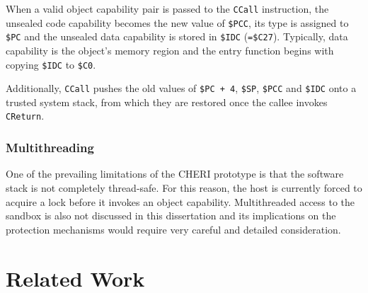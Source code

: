\documentclass[a4paper,12pt,twoside,openright]{report}
\newcommand{\reg}[1]{\texttt{\$#1}}
\newcommand{\insn}[1]{\texttt{#1}}
\begin{document}
When a valid object capability pair is passed to the \insn{CCall} instruction, the unsealed code capability becomes the new value of \reg{PCC}, its type is assigned to \reg{PC} and the unsealed data capability is stored in \reg{IDC} (\texttt{=\reg{C27}}). Typically, data capability is the object's memory region and the entry function begins with copying \reg{IDC} to \reg{C0}.

Additionally, \insn{CCall} pushes the old values of \texttt{\reg{PC}~+~4}, \reg{SP}, \reg{PCC} and \reg{IDC} onto a trusted system stack, from which they are restored once the callee invokes \insn{CReturn}.

\subsection{Multithreading}

One of the prevailing limitations of the CHERI prototype is that the software stack is not completely thread-safe. For this reason, the host is currently forced to acquire a lock before it invokes an object capability. Multithreaded access to the sandbox is also not discussed in this dissertation and its implications on the protection mechanisms would require very careful and detailed consideration.

\chapter{Related Work} 

% 
% 
\end{document}
